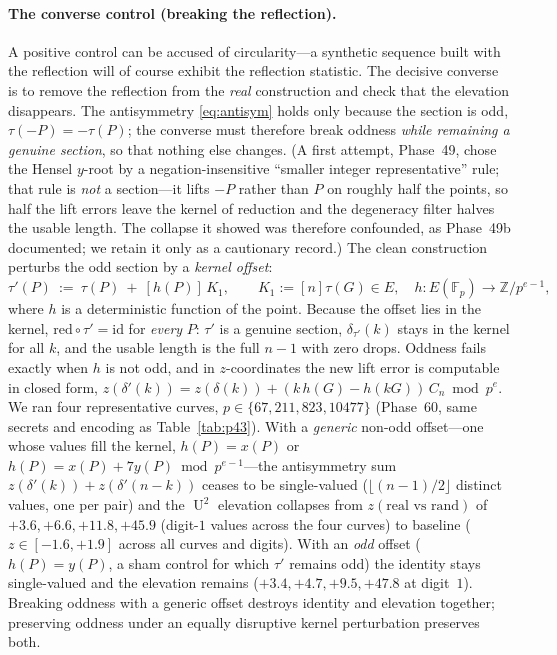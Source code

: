 \documentclass[11pt]{article}
\theoremstyle{definition}
\newcommand{\Fp}{\mathbb{F}_p}
\newcommand{\Z}{\mathbb{Z}}
\newcommand{\Ehat}{\widehat{E}}
\newcommand{\red}{\mathrm{red}}
\DeclareMathOperator{\Uk}{U}
\begin{document}
\paragraph{The converse control (breaking the reflection).} A positive
control can be accused of circularity---a synthetic sequence built with
the reflection will of course exhibit the reflection statistic. The
decisive converse is to remove the reflection from the \emph{real}
construction and check that the elevation disappears. The antisymmetry
\eqref{eq:antisym} holds only because the section is odd,
$\tau(-P)=-\tau(P)$; the converse must therefore break oddness
\emph{while remaining a genuine section}, so that nothing else changes.
(A first attempt, Phase~49, chose the Hensel $y$-root by a
negation-insensitive ``smaller integer representative'' rule; that rule
is \emph{not} a section---it lifts $-P$ rather than $P$ on roughly half
the points, so half the lift errors leave the kernel of reduction and the
degeneracy filter halves the usable length. The collapse it showed was
therefore confounded, as Phase~49b documented; we retain it only as a
cautionary record.) The clean construction perturbs the odd section by a
\emph{kernel offset}:
\[
\tau'(P)\ :=\ \tau(P)\ +\ [h(P)]\,K_1,\qquad
K_1:=[n]\tau(G)\in\Ehat,\quad h\colon E(\Fp)\to\Z/p^{e-1},
\]
where $h$ is a deterministic function of the point. Because the offset
lies in the kernel, $\red\circ\tau'=\mathrm{id}$ for \emph{every} $P$:
$\tau'$ is a genuine section, $\delta_{\tau'}(k)$ stays in the kernel for
all $k$, and the usable length is the full $n-1$ with zero drops. Oddness
fails exactly when $h$ is not odd, and in $z$-coordinates the new lift
error is computable in closed form,
$z(\delta'(k))=z(\delta(k))+(k\,h(G)-h(kG))\,C_n \bmod p^e$. We ran four
representative curves, $p\in\{67,211,823,10477\}$ (Phase~60, same secrets
and encoding as Table~\ref{tab:p43}). With a \emph{generic} non-odd
offset---one whose values fill the kernel, $h(P)=x(P)$ or $h(P)=x(P)+7y(P)
\bmod p^{e-1}$---the antisymmetry sum $z(\delta'(k))+z(\delta'(n-k))$
ceases to be single-valued ($\lfloor(n-1)/2\rfloor$ distinct values, one
per pair) and the $\Uk^2$ elevation collapses from $z(\text{real vs
rand})$ of $+3.6,+6.6,+11.8,+45.9$ (digit-$1$ values across the four
curves) to baseline ($z\in[-1.6,+1.9]$ across all curves and digits).
With an \emph{odd} offset ($h(P)=y(P)$, a sham control for which $\tau'$
remains odd) the identity stays single-valued and the elevation remains
($+3.4,+4.7,+9.5,+47.8$ at digit~$1$). Breaking oddness with a generic
offset destroys identity and elevation together; preserving oddness under
an equally disruptive kernel perturbation preserves both.
\end{document}
